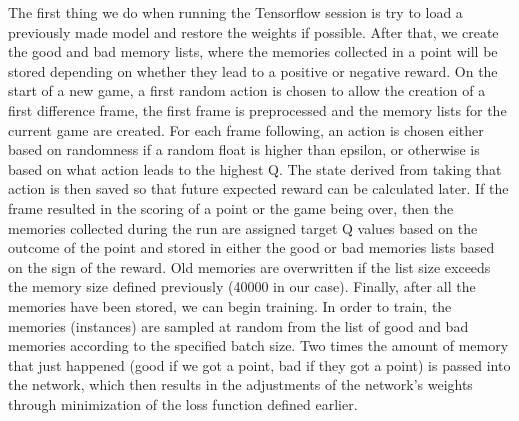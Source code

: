 \documentclass[12pt]{article}
\theoremstyle{plain}
\theoremstyle{definition}
\theoremstyle{remark}
\theoremstyle{plain}
\begin{document}
The first thing we do when running the Tensorflow session is try to load a previously made model and restore the weights if possible.  After that, we create the good and bad memory lists, where the memories collected in a point will be stored depending on whether they lead to a positive or negative reward.  On the start of a new game, a first random action is chosen to allow the creation of a first difference frame, the first frame is preprocessed and the memory lists for the current game are created.  For each frame following, an action is chosen either based on randomness if a random float is higher than epsilon, or otherwise is based on what action leads to the highest Q.  The state derived from taking that action is then saved so that future expected reward can be calculated later.  If the frame resulted in the scoring of a point or the game being over, then the memories collected during the run are assigned target Q values based on the outcome of the point and stored in either the good or bad memories lists based on the sign of the reward.  Old memories are overwritten if the list size exceeds the memory size defined previously (40000 in our case).  Finally, after all the memories have been stored, we can begin training.  In order to train, the memories (instances) are sampled at random from the list of good and bad memories according to the specified batch size.  Two times the amount of memory that just happened (good if we got a point, bad if they got a point) is passed into the network, which then results in the adjustments of the network's weights through minimization of the loss function defined earlier.
\end{document}
